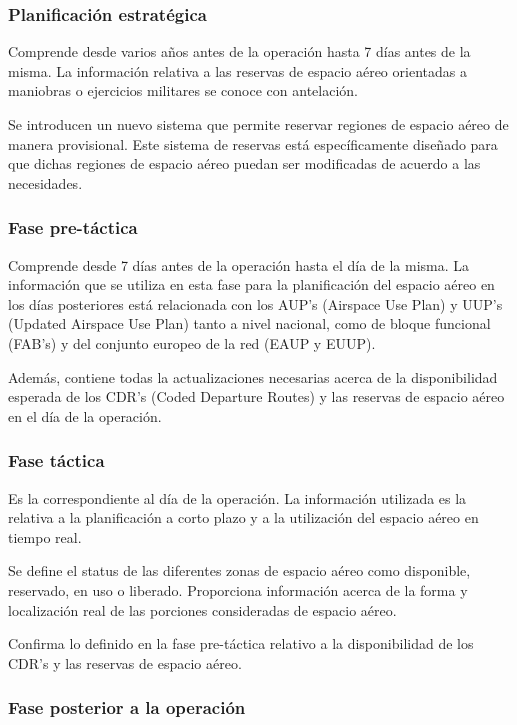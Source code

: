 \subsubsection{Planificación estratégica}

Comprende desde varios años antes de la operación hasta 7 días antes de la misma. La información relativa a las reservas de espacio aéreo orientadas a maniobras o ejercicios militares se conoce con antelación.

Se introducen un nuevo sistema que permite reservar regiones de espacio aéreo de manera provisional. Este sistema de reservas está específicamente diseñado para que dichas regiones de espacio aéreo puedan ser modificadas de acuerdo a las necesidades. 

\subsubsection{Fase pre-táctica}

Comprende desde 7 días antes de la operación hasta el día de la misma. 
La información que se utiliza en esta fase para la planificación del espacio aéreo en los días posteriores está relacionada con los AUP’s (Airspace Use Plan) y UUP’s (Updated Airspace Use Plan) tanto a nivel nacional, como de bloque funcional (FAB’s) y del conjunto europeo de la red (EAUP y EUUP).

Además, contiene todas la actualizaciones necesarias acerca de la disponibilidad esperada de los CDR’s (Coded Departure Routes) y las reservas de espacio aéreo en el día de la operación.

\subsubsection{Fase táctica}

Es la correspondiente al día de la operación.
La información utilizada es la relativa a la planificación a corto plazo y a la utilización del espacio aéreo en tiempo real.

Se define el status de las diferentes zonas de espacio aéreo como disponible, reservado, en uso o liberado. Proporciona información acerca de la forma y localización real de las porciones consideradas de espacio aéreo. 

Confirma lo definido en la fase pre-táctica relativo a la disponibilidad de los CDR’s y las reservas de espacio aéreo.

\subsubsection{Fase posterior a la operación}

